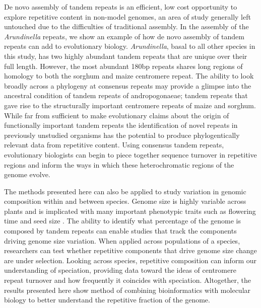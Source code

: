 \documentclass[10pt,letterpaper]{article}
\newcommand{\jri}[1]{\todo[size=\scriptsize, color=SkyBlue]{#1}}
\newcommand{\pb}[1]{\todo[size=\scriptsize, color=Bittersweet]{#1}} %
\begin{document}
De novo assembly of tandem repeats is an efficient, low cost opportunity to explore repetitive content in non-model genomes, an area of study generally left untouched due to the difficulties of traditional assembly.
In the assembly of the \emph{Arundinella} repeats, we show an example of how de novo assembly of tandem repeats can add to evolutionary biology.
\emph{Arundinella}, basal to all other species in this study, has two highly abundant tandem repeats that are unique over their full length.
However, the most abundant 180bp repeats shares long regions of homology to both the sorghum and maize centromere repeat.
The ability to look broadly across a phylogeny at consensus repeats may provide a glimpse into the ancestral condition of tandem repeats of andropogonaeae; tandem repeats that gave rise to the structurally important centromere repeats of maize and sorghum.%
While far from sufficient to make evolutionary claims about the origin of functionally important tandem repeats %
the identification of novel repeats in previously unstudied organisms has the potential to produce phylogentically relevant data from repetitive content.%
Using consensus tandem repeats, evolutionary biologists can begin to piece together sequence turnover in repetitive regions \cite{henikoff2001centromere} and inform the ways in which these heterochromatic regions of the genome evolve.

The methods presented here can also be applied to study variation in genomic composition within and between species.
Genome size is highly variable across plants \cite{kewc} and is implicated with many important phenotypic traits such as flowering time and seed size \cite{rayburn1994selection,knight2005large}.
The ability to identify what percentage of the genome is composed by tandem repeats can enable studies that track the components driving genome size variation.
When applied across populations of a species, researchers can test whether repetitive components that drive genome size change are under selection.
Looking across species, repetitive composition can inform our understanding of speciation, providing data toward the ideas of centromere repeat turnover and how frequently it coincides with speciation.
Altogether, the results presented here show method of combining bioinformatics with molecular biology to better understand the repetitive fraction of the genome.
\end{document}
